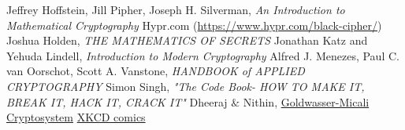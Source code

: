 
	\begin{thebibliography}{20}
		  Jeffrey Hoffstein, Jill Pipher, Joseph H. Silverman, \emph{An Introduction to Mathematical Cryptography}
		 Hypr.com (\textcolor{blue}{\url{https://www.hypr.com/black-cipher/}})
		  Joshua Holden, \emph{THE MATHEMATICS OF SECRETS}
		  Jonathan Katz and Yehuda Lindell, \emph{Introduction to Modern Cryptography}
		  Alfred J. Menezes, Paul C. van Oorschot, Scott A. Vanstone, \emph{HANDBOOK of APPLIED CRYPTOGRAPHY}
		  Simon Singh,\emph{ "The Code Book- HOW TO MAKE IT, BREAK IT, HACK IT, CRACK IT"}
		  Dheeraj $\&$ Nithin, \href{https://bit.ly/3IFyTW7}{Goldwasser-Micali Cryptosystem}
		  \href{https://xkcd.com/}{XKCD comics}
		 
	\end{thebibliography}